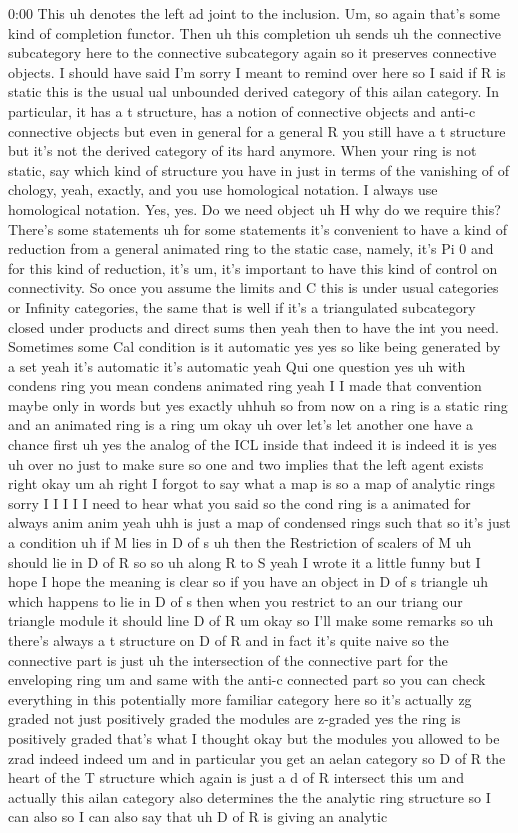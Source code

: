 \begin{unfinished}{0:00}
This uh denotes the left ad joint to the inclusion. Um, so again that's some kind of completion functor. Then uh this completion uh sends uh the connective subcategory here to the connective subcategory again so it preserves connective objects. I should have said I'm sorry I meant to remind over here so I said if R is static this is the usual ual unbounded derived category of this ailan category. In particular, it has a t structure, has a notion of connective objects and anti-c connective objects but even in general for a general R you still have a t structure but it's not the derived category of its hard anymore. When your ring is not static, say which kind of structure you have in just in terms of the vanishing of of chology, yeah, exactly, and you use homological notation. I always use homological notation. Yes, yes. Do we need object uh H why do we require this? There's some statements uh for some statements it's convenient to have a kind of reduction from a general animated ring to the static case, namely, it's Pi 0 and for this kind of reduction, it's um, it's important to have this kind of control on connectivity. So once you assume the limits and C this is under usual categories or Infinity categories, the same that is well if it's a triangulated subcategory closed under products and direct sums then yeah then to have the int you need. Sometimes some Cal condition is it automatic yes yes so like being generated by a set yeah it's automatic it's automatic yeah Qui one question yes uh with condens ring you mean condens animated ring yeah I I made that convention maybe only in words but yes exactly uhhuh so from now on a ring is a static ring and an animated ring is a ring um okay uh over let's let another one have a chance first uh yes the analog of the ICL inside that indeed it is indeed it is yes uh over no just to make sure so one and two implies that the left agent exists right okay um ah right I forgot to say what a map is so a map of analytic rings sorry I I I I I need to hear what you said so the cond ring is a animated for always anim anim yeah uhh is just a map of condensed rings such that so it's just a condition uh if M lies in D of s uh then the Restriction of scalers of M uh should lie in D of R so so uh along R to S yeah I wrote it a little funny but I hope I hope the meaning is clear so if you have an object in D of s triangle uh which happens to lie in D of s then when you restrict to an our triang our triangle module it should line D of R um okay so I'll make some remarks so uh there's always a t structure on D of R and in fact it's quite naive so the connective part is just uh the intersection of the connective part for the enveloping ring um and same with the anti-c connected part so you can check everything in this potentially more familiar category here so it's actually zg graded not just positively graded the modules are z-graded yes the ring is positively graded that's what I thought okay but the modules you allowed to be zrad indeed indeed um and in particular you get an aelan category so D of R the heart of the T structure which again is just a d of R intersect this um and actually this ailan category also determines the the analytic ring structure so I can also so I can also say that uh D of R is giving an analytic 
\end{unfinished}
